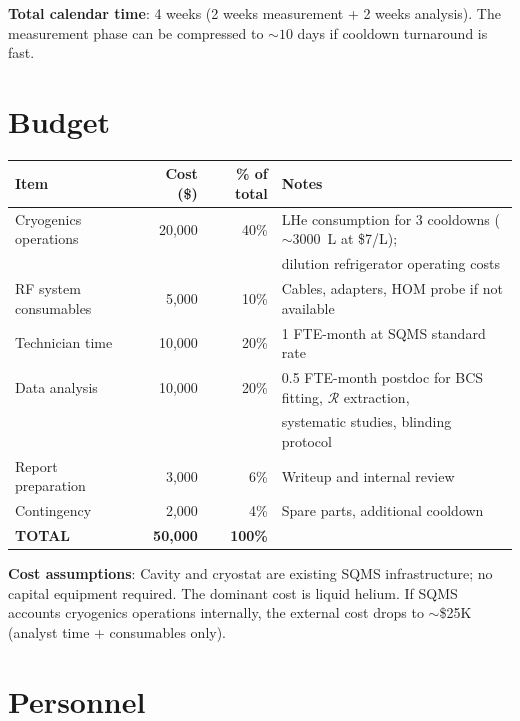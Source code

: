 \documentclass[11pt]{article}
\newcommand{\Rq}{\mathcal{R}}
\begin{document}
\textbf{Total calendar time}: 4 weeks (2 weeks measurement + 2 weeks
analysis). The measurement phase can be compressed to $\sim 10$ days
if cooldown turnaround is fast.


\section{Budget}
\label{sec:budget}

\begin{center}
\renewcommand{\arraystretch}{1.3}
\begin{tabular}{@{}lrrp{5cm}@{}}
\toprule
\textbf{Item} & \textbf{Cost (\$)} & \textbf{\% of total} &
\textbf{Notes} \\
\midrule
Cryogenics operations & 20,000 & 40\% &
  LHe consumption for 3 cooldowns ($\sim$3000~L at \$7/L); \\
  & & & dilution refrigerator operating costs \\
RF system consumables & 5,000 & 10\% &
  Cables, adapters, HOM probe if not available \\
Technician time & 10,000 & 20\% &
  1 FTE-month at SQMS standard rate \\
Data analysis & 10,000 & 20\% &
  0.5 FTE-month postdoc for BCS fitting, $\Rq$ extraction, \\
  & & & systematic studies, blinding protocol \\
Report preparation & 3,000 & 6\% &
  Writeup and internal review \\
Contingency & 2,000 & 4\% &
  Spare parts, additional cooldown \\
\midrule
\textbf{TOTAL} & \textbf{50,000} & \textbf{100\%} & \\
\bottomrule
\end{tabular}
\end{center}

\textbf{Cost assumptions}: Cavity and cryostat are existing SQMS
infrastructure; no capital equipment required. The dominant cost is
liquid helium. If SQMS accounts cryogenics operations internally,
the external cost drops to $\sim$\$25K (analyst time + consumables
only).


\section{Personnel}
\label{sec:personnel}
\end{document}
